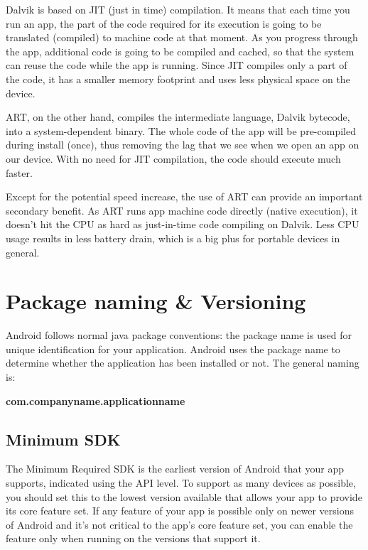 Dalvik is based on JIT (just in time) compilation.
It means that each time you run an app, the part of the code required for its execution is going to be translated (compiled) to machine code at that moment.
As you progress through the app, additional code is going to be compiled and cached, so that the system can reuse the code while the app is running.
Since JIT compiles only a part of the code, it has a smaller memory footprint and uses less physical space on the device.

ART, on the other hand, compiles the intermediate language, Dalvik bytecode, into a system-dependent binary.
The whole code of the app will be pre-compiled during install (once), thus removing the lag that we see when we open an app on our device.
With no need for JIT compilation, the code should execute much faster.

Except for the potential speed increase, the use of ART can provide an important secondary benefit.
As ART runs app machine code directly (native execution), it doesn't hit the CPU as hard as just-in-time code compiling on Dalvik.
Less CPU usage results in less battery drain, which is a big plus for portable devices in general.


\section{Package naming \& Versioning}
Android follows normal java package conventions: the package name is used for unique identification for your application.
Android uses the package name to determine whether the application has been installed or not.
The general naming is:

\begin{center}
	\textbf{com.companyname.applicationname}
\end{center}

\subsection{Minimum SDK}
The Minimum Required SDK is the earliest version of Android that your app supports, indicated using the API level.
To support as many devices as possible, you should set this to the lowest version available that allows your app to provide its core feature set.
If any feature of your app is possible only on newer versions of Android and it's not critical to the app's core feature set, you can enable the feature only when running on the versions that support it.

